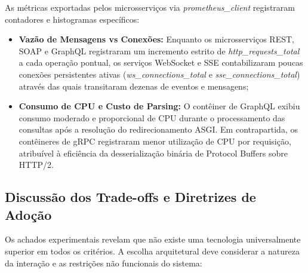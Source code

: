 \documentclass[a4paper,12pt]{article}
\begin{document}
As métricas exportadas pelos microsserviços via \textit{prometheus\_client} registraram contadores e histogramas específicos:
\begin{itemize}
    \item \textbf{Vazão de Mensagens vs Conexões:} Enquanto os microsserviços REST, SOAP e GraphQL registraram um incremento estrito de \textit{http\_requests\_total} a cada operação pontual, os serviços WebSocket e SSE contabilizaram poucas conexões persistentes ativas (\textit{ws\_connections\_total} e \textit{sse\_connections\_total}) através das quais transitaram dezenas de eventos e mensagens;
    \item \textbf{Consumo de CPU e Custo de Parsing:} O contêiner de GraphQL exibiu consumo moderado e proporcional de CPU durante o processamento das consultas após a resolução do redirecionamento ASGI. Em contrapartida, os contêineres de gRPC registraram menor utilização de CPU por requisição, atribuível à eficiência da desserialização binária de Protocol Buffers sobre HTTP/2.
\end{itemize}

\subsection{Discussão dos Trade-offs e Diretrizes de Adoção}

Os achados experimentais revelam que não existe uma tecnologia universalmente superior em todos os critérios. A escolha arquitetural deve considerar a natureza da interação e as restrições não funcionais do sistema:
\end{document}
